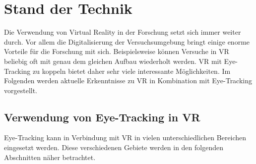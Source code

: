 
\chapter{Stand der Technik}
Die Verwendung von Virtual Reality in der Forschung setzt sich immer weiter durch. Vor allem die Digitalisierung der Versuchsumgebung bringt einige enorme Vorteile für die Forschung mit sich. Beispielsweise können Versuche in VR beliebig oft mit genau dem gleichen Aufbau wiederholt werden. VR mit Eye-Tracking zu koppeln bietet daher sehr viele interessante Möglichkeiten\cite{Clay_Koenig_Koenig_2019}. Im Folgenden werden aktuelle Erkenntnisse zu VR in Kombination mit Eye-Tracking vorgestellt.

\section{Verwendung von Eye-Tracking in VR}
Eye-Tracking kann in Verbindung mit VR in vielen unterschiedlichen Bereichen eingesetzt werden\cite{Clay_Koenig_Koenig_2019}. Diese verschiedenen Gebiete werden in den folgenden Abschnitten näher betrachtet.
